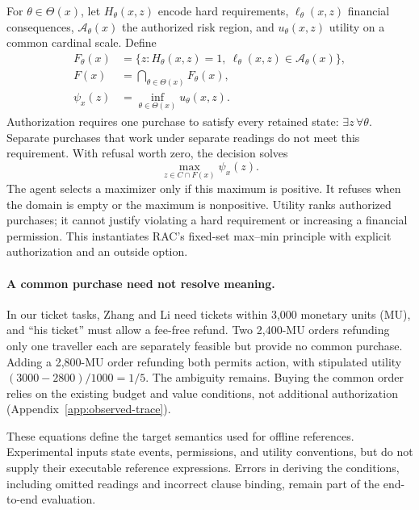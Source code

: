 \documentclass[11pt]{article}
\newcommand{\A}{\mathcal A}
\begin{document}
For $\theta\in\Theta(x)$, let $H_\theta(x,z)$ encode hard requirements, $\ell_\theta(x,z)$ financial consequences, $\A_\theta(x)$ the authorized risk region, and $u_\theta(x,z)$ utility on a common cardinal scale. Define
\begin{align}
F_\theta(x)&=\{z:H_\theta(x,z)=1,\ \ell_\theta(x,z)\in\A_\theta(x)\},\label{eq:state}\\
F(x)&=\bigcap_{\theta\in\Theta(x)}F_\theta(x),\label{eq:common}\\
\psi_x(z)&=\inf_{\theta\in\Theta(x)}u_\theta(x,z).\label{eq:robust}
\end{align}
Authorization requires one purchase to satisfy every retained state: $\exists z\,\forall\theta$. Separate purchases that work under separate readings do not meet this requirement. With refusal worth zero, the decision solves
\begin{equation}
\max_{z\in C\cap F(x)}\psi_x(z).
\label{eq:decision}
\end{equation}
The agent selects a maximizer only if this maximum is positive. It refuses when the domain is empty or the maximum is nonpositive. Utility ranks authorized purchases; it cannot justify violating a hard requirement or increasing a financial permission. This instantiates RAC's fixed-set max--min principle \citep{rac} with explicit authorization and an outside option.

\paragraph{A common purchase need not resolve meaning.}
In our ticket tasks, Zhang and Li need tickets within 3,000 monetary units (MU), and ``his ticket'' must allow a fee-free refund. Two 2,400-MU orders refunding only one traveller each are separately feasible but provide no common purchase. Adding a 2,800-MU order refunding both permits action, with stipulated utility $(3000-2800)/1000=1/5$. The ambiguity remains. Buying the common order relies on the existing budget and value conditions, not additional authorization (Appendix~\ref{app:observed-trace}).

These equations define the target semantics used for offline references. Experimental inputs state events, permissions, and utility conventions, but do not supply their executable reference expressions. Errors in deriving the conditions, including omitted readings and incorrect clause binding, remain part of the end-to-end evaluation.
\end{document}
